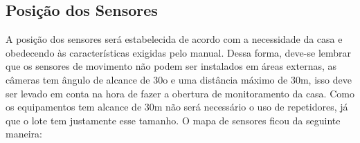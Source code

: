 \subsection{Posição dos Sensores}

A posição dos sensores será estabelecida de acordo com a necessidade da casa e obedecendo às características exigidas pelo manual. Dessa forma, deve-se lembrar que os sensores de movimento não podem ser instalados em áreas externas, as câmeras tem ângulo de alcance de 30o e uma distância máximo de 30m, isso deve ser levado em conta na hora de fazer a obertura de monitoramento da casa. Como os equipamentos tem alcance de 30m não será necessário o uso de repetidores, já que o lote tem justamente esse tamanho. O mapa de sensores ficou da seguinte maneira:

\begin{figure}[H]
  \begin{center}

\end{center}
\end{figure}
